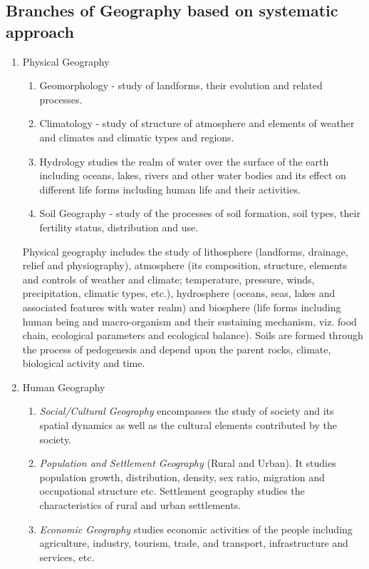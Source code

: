 \documentclass[8pt, a4paper, oneside, twocolumn]{extarticle}
\begin{document}
\subsection{Branches of Geography based on systematic approach}
\begin{enumerate}
  \item Physical Geography
  \begin{enumerate}
    \item Geomorphology - study of landforms, their evolution and related processes.
    \item Climatology - study of structure of atmosphere and elements of weather and climates and climatic types and regions.
    \item Hydrology studies the realm of water over the surface of the earth including oceans, lakes, rivers and other water bodies and its effect on different life forms including human life and their activities.
    \item Soil Geography - study of the processes of soil formation, soil types, their fertility status, distribution and use.
  \end{enumerate}
  Physical geography includes the study of lithosphere (landforms, drainage, relief and physiography), atmosphere (its composition, structure, elements and controls of weather and climate; temperature, pressure, winds, precipitation, climatic types, etc.), hydrosphere (oceans, seas, lakes and associated features with water realm) and biosphere (life forms including human being and macro-organism and their sustaining mechanism, viz. food chain, ecological parameters and ecological balance). Soils are formed through the process of pedogenesis and depend upon the parent rocks, climate, biological activity and time.
  \item Human Geography
  \begin{enumerate}
    \item \textit{Social/Cultural Geography} encompasses the study of society and its spatial dynamics as well as the cultural elements contributed by the society.
    \item \textit{Population and Settlement Geography} (Rural and Urban). It studies population growth, distribution, density, sex ratio, migration and occupational structure etc. Settlement geography studies the characteristics of rural and urban settlements.
    \item \textit{Economic Geography} studies economic activities of the people including agriculture, industry, tourism, trade, and transport, infrastructure and services, etc.

\end{enumerate}
\end{enumerate}
\end{document}
